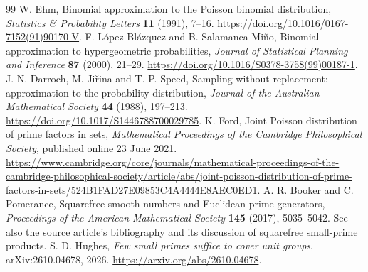 \documentclass[11pt]{article}
\theoremstyle{remark}\newtheorem{remark}[theorem]{Remark}
\begin{document}
\begin{thebibliography}{99}
 W. Ehm, Binomial approximation to the Poisson binomial distribution, \emph{Statistics \& Probability Letters} \textbf{11} (1991), 7--16. \url{https://doi.org/10.1016/0167-7152(91)90170-V}.
 F. L\'opez-Bl\'azquez and B. Salamanca Mi\~no, Binomial approximation to hypergeometric probabilities, \emph{Journal of Statistical Planning and Inference} \textbf{87} (2000), 21--29. \url{https://doi.org/10.1016/S0378-3758(99)00187-1}.
 J. N. Darroch, M. Ji\v rina and T. P. Speed, Sampling without replacement: approximation to the probability distribution, \emph{Journal of the Australian Mathematical Society} \textbf{44} (1988), 197--213. \url{https://doi.org/10.1017/S1446788700029785}.
 K. Ford, Joint Poisson distribution of prime factors in sets, \emph{Mathematical Proceedings of the Cambridge Philosophical Society}, published online 23 June 2021. \url{https://www.cambridge.org/core/journals/mathematical-proceedings-of-the-cambridge-philosophical-society/article/abs/joint-poisson-distribution-of-prime-factors-in-sets/524B1FAD27E09853C4A4444E8AEC0ED1}.
 A. R. Booker and C. Pomerance, Squarefree smooth numbers and Euclidean prime generators, \emph{Proceedings of the American Mathematical Society} \textbf{145} (2017), 5035--5042. See also the source article's bibliography and its discussion of squarefree small-prime products.
 S. D. Hughes, \emph{Few small primes suffice to cover unit groups}, arXiv:2610.04678, 2026. \url{https://arxiv.org/abs/2610.04678}.
\end{thebibliography}
\endgroup
\end{document}
